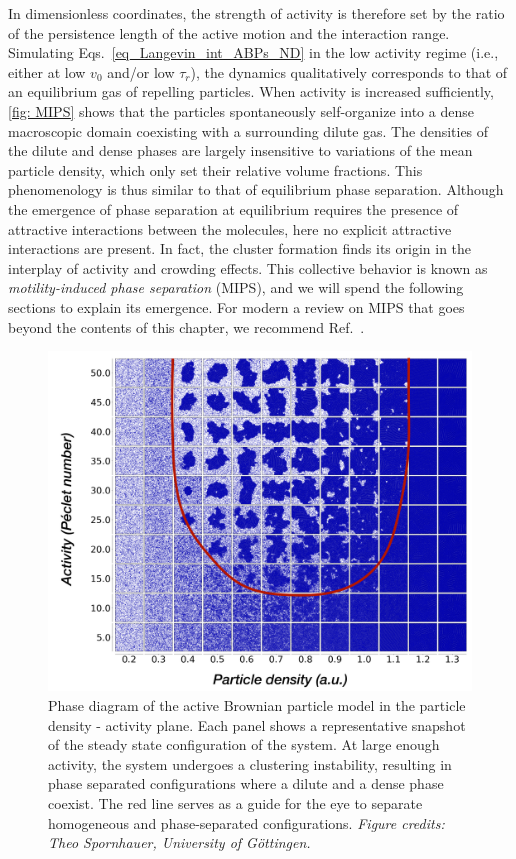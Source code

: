 In dimensionless coordinates, the strength of activity is therefore set by the ratio of the persistence length of the active motion and the interaction range.
Simulating Eqs.~\eqref{eq_Langevin_int_ABPs_ND} in the low activity regime (i.e., either at low $v_0$ and/or low $\tau_r$), 
the dynamics qualitatively corresponds to that of an equilibrium gas of repelling particles.
When activity is increased sufficiently, \autoref{fig: MIPS} shows that the particles spontaneously self-organize into a dense macroscopic domain coexisting with a surrounding dilute gas.
The densities of the dilute and dense phases are largely insensitive to variations of the mean particle density, which only set their relative volume fractions.
This phenomenology is thus similar to that of equilibrium phase separation.
Although the emergence of phase separation at equilibrium requires the presence of attractive interactions between the molecules,
here no explicit attractive interactions are present.
In fact, the cluster formation finds its origin in the interplay of activity and crowding effects.
This collective behavior is known as \textit{motility-induced phase separation} (MIPS), and we will spend the following sections to explain its emergence. 
For modern a review on MIPS that goes beyond the contents of this chapter, we recommend Ref.~\cite{bookMIPS2023}.

\begin{figure}[!t]
    \centering
    \includegraphics[width=.6\textwidth]{chapters/Figures/scalar/Fig_MIPS_PD.pdf}
    \caption{Phase diagram of the active Brownian particle model in the particle density - activity plane.
    Each panel shows a representative snapshot of the steady state configuration of the system.
    At large enough activity, the system undergoes a clustering instability, resulting in phase separated configurations where a dilute and a dense phase coexist.
    The red line serves as a guide for the eye to separate homogeneous and phase-separated configurations.
    \textit{Figure credits: Theo Spornhauer, University of Göttingen.}}
    \label{fig: MIPS}
\end{figure}

